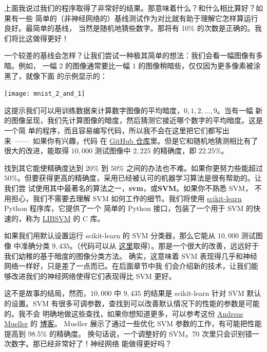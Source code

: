 

上面我说过我们的程序取得了非常好的结果。那意味着什么？和什么相比算好？如果有一些
简单的（非神经网络的）基线测试作为对比就有助于理解它怎样算运行良好。最简单的基线，
当然是随机地猜些数字。那将有 10\% 的次数是正确的。我们将比这做得更好！

一个较差的基线会怎样？让我们尝试一种极其简单的想法：我们会看一幅图像有多暗。例如，
一幅 $2$ 的图像通常要比一幅 $1$ 的图像稍暗些，仅仅因为更多像素被涂黑了，就像下面
的示例显示的：
\begin{center}
  \texttt{[image: mnist\_2\_and\_1]}
\end{center}

这提示我们可以用训练数据来计算数字图像的平均暗度，$0, 1, 2,\ldots, 9$。当有一幅
新的图像呈现，我们先计算图像的暗度，然后猜测它接近哪个数字的平均暗度。这是一个简
单的程序，而且容易编写代码，所以我不会在这里把它们都写出来~——~如果你有兴趣，代码
在
\href{https://github.com/mnielsen/neural-networks-and-deep-learning/blob/master/src/mnist_average_darkness.py}{GitHub
  仓库}里。但是它和随机地猜测相比有了很大的改进，能取得 $10,000$ 测试图像中
$2,225$ 的精确度，即 $22.25\%$。

找到其它能使精确度达到 $20\%$ 到 $50\%$ 之间的办法也不难。如果你更努力些能超过
$50\%$。但要获得更高的精确度，采用已经被认可的机器学习算法是很有帮助的。让我们尝
试使用其中最著名的算法之一，\textbf{\gls{svm}}，或\textbf{SVM}。如果你不熟悉 SVM，
不用担心，我们不需要去理解 SVM 如何工作的细节。我们将使用
\href{http://scikit-learn.org/stable/}{scikit-learn} Python 程序库，它提供了一个
简单的 Python 接口，包装了一个用于 SVM 的快速的，称为
\href{http://www.csie.ntu.edu.tw/~cjlin/libsvm/}{LIBSVM} 的 C 库。

如果我们用默认设置运行 scikit-learn 的 SVM 分类器，那么它能从 $10,000$ 测试图像
中准确分类 $9,435$。（代码可以从%
  \href{https://github.com/mnielsen/neural-networks-and-deep-learning/blob/master/src/mnist_svm.py}{
    这里}取得）。那是一个很大的改善，远远好于我们幼稚的基于暗度的图像分类方法。
确实，这意味着 SVM 表现得几乎和神经网络一样好，只是差了一点而已。在后面章节中我
们会介绍新的技术，让我们能够改进我们的神经网络使得它们表现得比 SVM 更好。

这不是故事的结局，然而，$10,000$ 中 $9,435$ 的结果是 scikit-learn 针对 SVM 默认
的设置。SVM 有很多可调参数，查找到可以改善默认情况下的性能的参数是可能的。我不会
明确地做这些查找，如果你想知道更多，可以参考这份
\href{http://peekaboo-vision.blogspot.ca/}{Andreas Mueller} 的%
\href{http://peekaboo-vision.blogspot.de/2010/09/mnist-for-ever.html}{博客}。
Mueller 展示了通过一些优化 SVM 参数的工作，有可能把性能提高到 98.5\% 的精确度。
换句话说，一个调整好的 SVM，70 次里只会识别错一次数字。那已经非常好了！神经网络
能做得更好吗？

